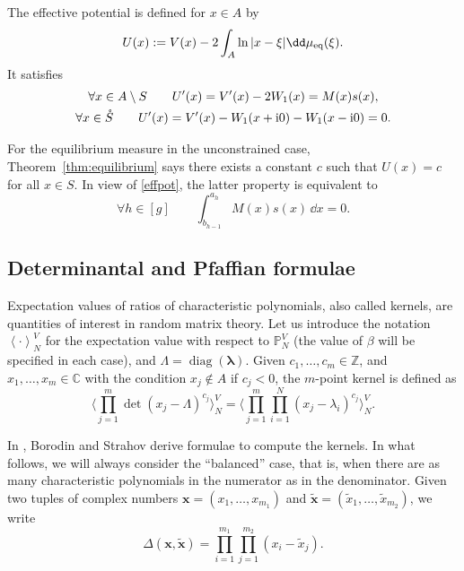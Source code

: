 \documentclass[10pt,a4paper]{amsart}
\numberwithin{equation}{section}
\newcommand{\mean}[1]{\left\langle{#1}\right\rangle}
\begin{document}
\begin{Definition}
The effective potential is defined for $x \in A$ by
\[
U(x) := V(x) - 2 \int_{A} \ln|x - \xi|\dd \mu_{{\rm eq}}(\xi).
\]
 It satisfies
\begin{gather}
\forall x \in A \setminus S  \qquad U'(x) = V'(x) - 2W_1(x) = M(x)s(x), \nonumber\\
\forall x \in \mathring{S}  \qquad U'(x) = V'(x) - W_1(x + {\rm i}0) - W_1(x - {\rm i}0) = 0.\label{effpot}
\end{gather}
\end{Definition}
\begin{Remark}%
\label{Rem:vanishint} For the equilibrium measure in the unconstrained case, Theorem~\ref{thm:equilibrium} says there exists a constant $c$ such that $U(x) = c$ for all $x \in S$. In view of \eqref{effpot}, the latter property is equivalent to
\begin{equation*}
\forall h \in [g]\qquad \int_{b_{h - 1}}^{a_h} M(x)s(x)\,\dd x = 0.
\end{equation*}
\end{Remark}

\subsection{Determinantal and Pfaffian
 formulae}%

Expectation values of ratios of
characteristic polynomials, also called kernels, are quantities of interest in random matrix theory. Let us introduce the notation
 $\mean{\cdot}^{V}_{N}$ for the expectation value with respect to $\mathbb{P}_{N}^V$ (the value of $\beta$ will be specified in each case), and $\Lambda = \operatorname{diag}(\bm{\lambda})$. Given $c_1,\ldots,c_m \in \mathbb{Z}$, and $x_1,\ldots,x_m \in \mathbb{C}$ with the condition $x_j \notin A$ if $c_j < 0$, the $m$-point kernel is defined as
\[
 \Biggl\langle \prod_{j=1}^{m} \det (x_{j} - \Lambda)^{c_j}\Biggr\rangle_{N}^{V} = \Biggl\langle \prod_{j=1}^{m} \prod_{i = 1}^{N} (x_{j} - \lambda_i)^{c_j}\Biggr\rangle_{N}^{V}.
\]

In \cite{borodin_averages}, Borodin and Strahov derive formulae
to compute the kernels. In what follows, we will always consider the ``balanced'' case, that
is, when there are as many characteristic polynomials in the numerator
as in the denominator. Given two tuples of complex numbers $\bm{x} = (x_{1}, \ldots, x_{m_1})$ and
$\bm{\tilde{x}} = (\tilde{x}_{1}, \ldots, \tilde{x}_{m_2})$, we write
\begin{equation*}
 \Delta(\bm{x},\bm{\tilde{x}}) = \prod_{i=1}^{m_1}\prod_{j=1}^{m_2} (x_{i} - \tilde{x}_{j}).
\end{equation*}
\end{document}

